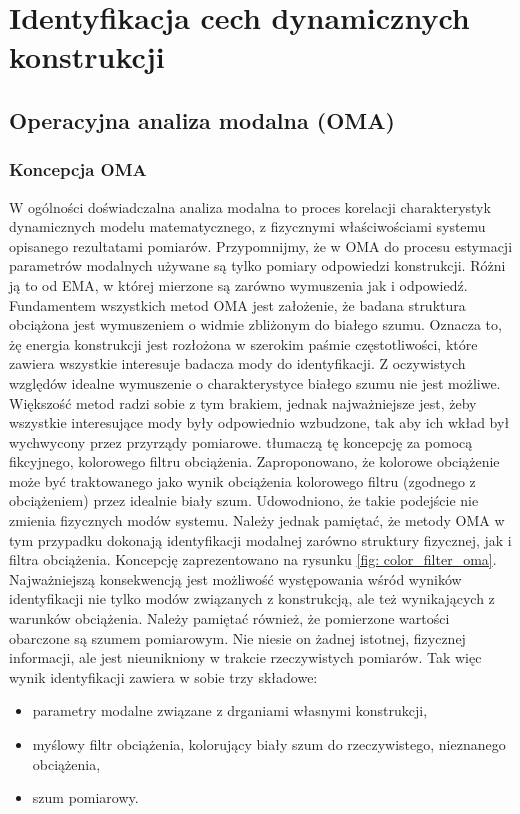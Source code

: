 \chapter{Identyfikacja cech dynamicznych konstrukcji}

\section{Operacyjna analiza modalna (OMA)}
\subsection{Koncepcja OMA}
W ogólności doświadczalna analiza modalna to proces korelacji charakterystyk dynamicznych modelu matematycznego, z fizycznymi właściwościami systemu opisanego rezultatami pomiarów. Przypomnijmy, że w OMA do procesu estymacji parametrów modalnych używane są tylko pomiary odpowiedzi konstrukcji. Różni ją to od EMA, w której mierzone są zarówno wymuszenia jak i odpowiedź. 
Fundamentem wszystkich metod OMA jest założenie, że badana struktura obciążona jest wymuszeniem o widmie zbliżonym do białego szumu. Oznacza to, żę energia konstrukcji jest rozłożona w szerokim paśmie częstotliwości, które zawiera wszystkie interesuje badacza mody do identyfikacji. Z oczywistych względów idealne wymuszenie o charakterystyce białego szumu nie jest możliwe. Większość metod radzi sobie z tym brakiem, jednak najważniejsze jest, żeby wszystkie interesujące mody były odpowiednio wzbudzone, tak aby ich wkład był wychwycony przez przyrządy pomiarowe. \cite{Brincker2015} tłumaczą tę koncepcję za pomocą fikcyjnego, kolorowego filtru obciążenia. Zaproponowano, że kolorowe obciążenie może być traktowanego jako wynik obciążenia kolorowego filtru (zgodnego z obciążeniem) przez idealnie biały szum. Udowodniono, że takie podejście nie zmienia fizycznych modów systemu. Należy jednak pamiętać, że metody OMA w tym przypadku dokonają identyfikacji modalnej zarówno struktury fizycznej, jak i filtra obciążenia. Koncepcję zaprezentowano na rysunku \ref{fig: color_filter_oma}. Najważniejszą konsekwencją jest możliwość występowania wśród wyników identyfikacji nie tylko modów związanych z konstrukcją, ale też wynikających z warunków obciążenia. Należy pamiętać również, że pomierzone wartości obarczone są szumem pomiarowym. Nie niesie on żadnej istotnej, fizycznej informacji, ale jest nieunikniony w trakcie rzeczywistych pomiarów. Tak więc wynik identyfikacji zawiera w sobie trzy składowe:
\begin{itemize}[noitemsep]
	\item parametry modalne związane z drganiami własnymi konstrukcji,
	\item myślowy filtr obciążenia, kolorujący biały szum do rzeczywistego, nieznanego obciążenia,
	\item szum pomiarowy.
\end{itemize} 
